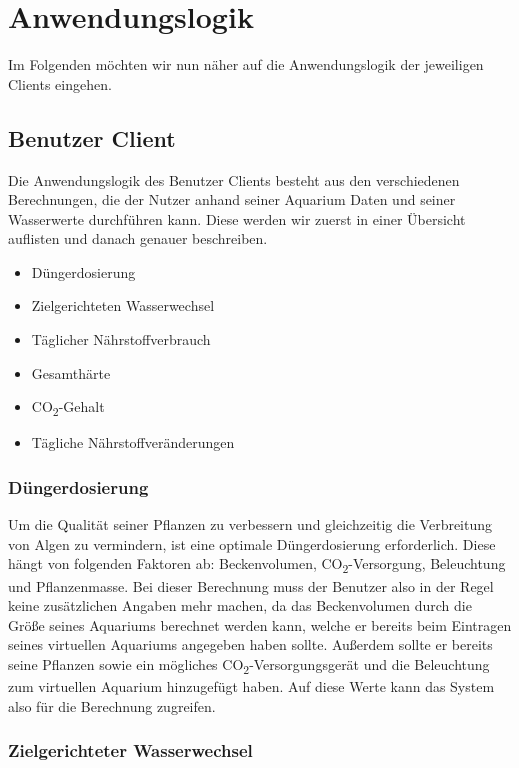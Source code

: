 \section{Anwendungslogik}

Im Folgenden möchten wir nun näher auf die Anwendungslogik der jeweiligen Clients eingehen. 

\subsection{Benutzer Client}

Die Anwendungslogik des Benutzer Clients besteht aus den verschiedenen Berechnungen, die der Nutzer anhand seiner Aquarium Daten und seiner Wasserwerte durchführen kann. Diese werden wir zuerst in einer Übersicht auflisten und danach genauer beschreiben.

\begin{itemize}
\item Düngerdosierung
\item Zielgerichteten Wasserwechsel
\item Täglicher Nährstoffverbrauch
\item Gesamthärte
\item CO\textsubscript{2}-Gehalt
\item Tägliche Nährstoffveränderungen
\end{itemize}

\subsubsection{Düngerdosierung}

Um die Qualität seiner Pflanzen zu verbessern und gleichzeitig die Verbreitung von Algen zu vermindern, ist eine optimale Düngerdosierung erforderlich. Diese hängt von folgenden Faktoren ab: Beckenvolumen, CO\textsubscript{2}-Versorgung, Beleuchtung und Pflanzenmasse. Bei dieser Berechnung muss der Benutzer also in der Regel keine zusätzlichen Angaben mehr machen, da das Beckenvolumen durch die Größe seines Aquariums berechnet werden kann, welche er bereits beim Eintragen seines virtuellen Aquariums angegeben haben sollte. Außerdem sollte er bereits seine Pflanzen sowie ein mögliches CO\textsubscript{2}-Versorgungsgerät und die Beleuchtung zum virtuellen Aquarium hinzugefügt haben. Auf diese Werte kann das System also für die Berechnung zugreifen.

\subsubsection{Zielgerichteter Wasserwechsel}

